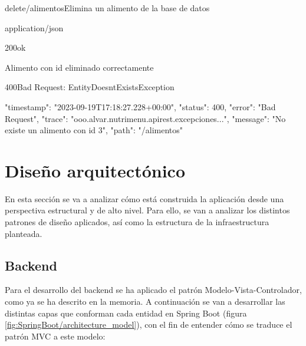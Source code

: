 \begin{table}[htp]
\begin{apiRoute}{delete}{/alimentos}{Elimina un alimento de la base de datos}
	\begin{routeParameter}
	\end{routeParameter}
	\begin{routeResponse}{application/json}
		\begin{routeResponseItem}{200}{ok}
			\begin{routeResponseItemBody}
Alimento con id eliminado correctamente	
			\end{routeResponseItemBody}
		\end{routeResponseItem}
		
	\begin{routeResponseItem}{400}{Bad Request: EntityDoesntExistsException}
			\begin{routeResponseItemBody}
{
    "timestamp": "2023-09-19T17:18:27.228+00:00",
    "status": 400,
    "error": "Bad Request",
    "trace": "ooo.alvar.nutrimenu.apirest.excepciones...",
    "message": "No existe un alimento con id 3",
    "path": "/alimentos"
}
			\end{routeResponseItemBody}
		\end{routeResponseItem}
		
	\end{routeResponse}
\end{apiRoute}
\caption{Endpoint que permite eliminar un alimento}
\end{table} \afterpage{\clearpage}

\section{Diseño arquitectónico}


En esta sección se va a analizar cómo está construida la aplicación desde una perspectiva estructural y de alto nivel. Para ello, se van a analizar los distintos patrones de diseño aplicados, así como la estructura de la infraestructura planteada. 

\subsection{Backend}

Para el desarrollo del backend se ha aplicado el patrón Modelo-Vista-Controlador, como ya se ha descrito en la memoria. A continuación se van a desarrollar las distintas capas que conforman cada entidad en Spring Boot (figura \ref{fig:SpringBoot/architecture_model}), con el fin de entender cómo se traduce el patrón MVC a este modelo:

